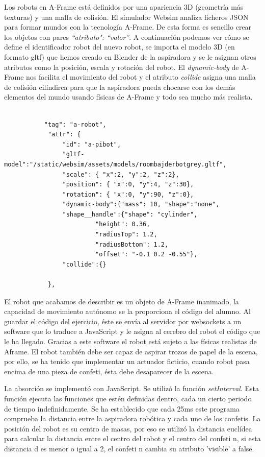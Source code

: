 Los robots en A-Frame está definidos por una apariencia 3D (geometría más texturas) y una malla de colisión.
El simulador Websim analiza ficheros JSON para formar mundos con la tecnología A-Frame. De esta forma es sencillo crear los objetos con pares \textit{``atributo": ``valor''}. A continuación podemos ver cómo se define el identificador robot del nuevo robot, se importa el modelo 3D (en formato gltf) que hemos creado en Blender de la aspiradora y se le asignan otros atributos como la posición, escala y rotación del robot. El \textit{dynamic-body} de A-Frame nos facilita el movimiento del robot y el atributo \textit{collide} asigna una malla de colisión cilíndirca para que la aspiradora pueda chocarse con los demás elementos del mundo usando físicas de A-Frame y todo sea mucho más realista.


\begin{lstlisting}
 
           "tag": "a-robot",
            "attr": {
                "id": "a-pibot",
                "gltf-model":"/static/websim/assets/models/roombajderbotgrey.gltf",
                "scale": { "x":2, "y":2, "z":2},
                "position": { "x":0, "y":4, "z":30},
                "rotation": { "x":0, "y":90, "z":0},
                "dynamic-body":{"mass": 10, "shape":"none",
                "shape__handle":{"shape": "cylinder",
                         "height": 0.36,
                         "radiusTop": 1.2,
                         "radiusBottom": 1.2,
                         "offset": "-0.1 0.2 -0.55"},
                "collide":{}

            },
\end{lstlisting}

El robot que acabamos de describir es un objeto de A-Frame inanimado, la capacidad de movimiento autónomo se la proporciona el código del alumno. Al guardar el código del ejercicio, éste se envía al servidor por websockets a un software que lo traduce a JavaScript y le asigna al cerebro del robot el código que le ha llegado. Gracias a este software el robot está sujeto a las físicas realistas de Aframe.
El robot  también debe ser capaz de aspirar trozos de papel de la escena, por ello, se ha tenido que implementar un actuador ficticio, cuando robot pasa encima de una pieza de confeti, ésta debe desaparecer de la escena.

La absorción se implementó con JavaScript. Se utilizó la función \textit{setInterval}. Esta función ejecuta las funciones que estén definidas dentro, cada un cierto periodo de tiempo indefinidamente.
Se ha establecido que cada 25ms este programa comprueba la distancia entre la aspiradora robótica y cada uno de los confetis. La posición del robot es su centro de masas, por eso se  utilizó la distancia euclídea para calcular la distancia entre el centro del robot y el centro del confeti n, si esta distancia d es menor o igual a 2, el confeti n cambia su atributo 'visible' a false. 


